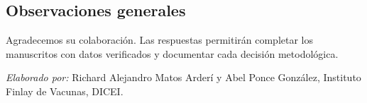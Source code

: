 \documentclass[11pt]{article}
\newcommand{\Seccion}[1]{\Needspace{14\baselineskip}\section*{\color{azul}#1}}
\begin{document}
\begin{Form}
\Seccion{Observaciones generales}
\noindent
\TextField[name=observaciones,multiline=true,width=\linewidth,height=5cm,charsize=10pt,%
  bordercolor=gris,backgroundcolor=fondo,align=0]{}\par\bigskip

Agradecemos su colaboración. Las respuestas permitirán completar los manuscritos con datos
verificados y documentar cada decisión metodológica.

\medskip
\textit{Elaborado por:} Richard Alejandro Matos Arderí y Abel Ponce González, Instituto Finlay de
Vacunas, DICEI.
\end{Form}
\end{document}
